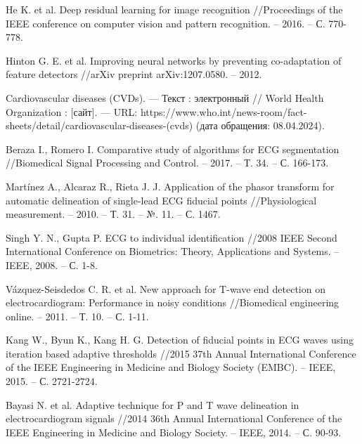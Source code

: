 \begin{thebibliography}{00}
    He K. et al. Deep residual learning for image recognition //Proceedings of
    the IEEE conference on computer vision and pattern recognition. – 2016. –
    С. 770-778.

    Hinton G. E. et al. Improving neural networks by preventing co-adaptation
    of feature detectors //arXiv preprint arXiv:1207.0580. – 2012.

    Cardiovascular diseases (CVDs). --- Текст : электронный // World Health
    Organization : [сайт]. --- URL:
    https://www.who.int/news-room/fact-sheets/detail/cardiovascular-diseases-(cvds)
    (дата обращения: 08.04.2024).

    Beraza I., Romero I. Comparative study of algorithms for ECG segmentation
    //Biomedical Signal Processing and Control. – 2017. – Т. 34. – С. 166-173.

    Martínez A., Alcaraz R., Rieta J. J. Application of the phasor transform
    for automatic delineation of single-lead ECG fiducial points
    //Physiological measurement. – 2010. – Т. 31. – №. 11. – С. 1467.

    Singh Y. N., Gupta P. ECG to individual identification //2008 IEEE Second
    International Conference on Biometrics: Theory, Applications and Systems. –
    IEEE, 2008. – С. 1-8.

    Vázquez-Seisdedos C. R. et al. New approach for T-wave end detection on
    electrocardiogram: Performance in noisy conditions //Biomedical engineering
    online. – 2011. – Т. 10. – С. 1-11.

    Kang W., Byun K., Kang H. G. Detection of fiducial points in ECG waves
    using iteration based adaptive thresholds //2015 37th Annual International
    Conference of the IEEE Engineering in Medicine and Biology Society (EMBC).
    – IEEE, 2015. – С. 2721-2724.

    Bayasi N. et al. Adaptive technique for P and T wave delineation in
    electrocardiogram signals //2014 36th Annual International Conference of
    the IEEE Engineering in Medicine and Biology Society. – IEEE, 2014. – С.
    90-93.

\end{thebibliography}
\endgroup
